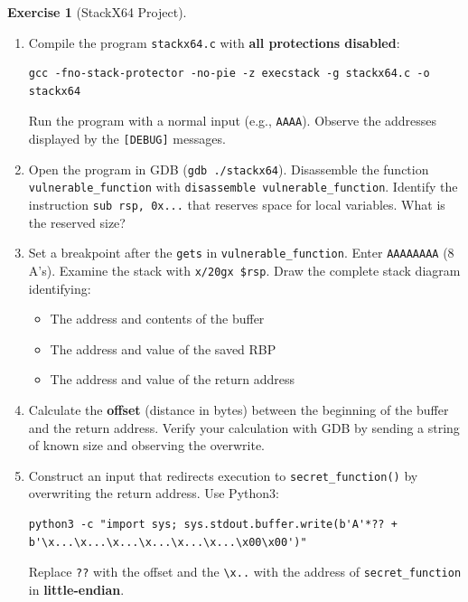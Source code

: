 \documentclass[a4paper,11pt]{article}
\theoremstyle{plain}
\theoremstyle{definition}
\newtheorem{exercice}{Exercise}
\begin{document}
\begin{exercice}[StackX64 Project]
\begin{enumerate}
\item[\textbf{1a)}] Compile the program \texttt{stackx64.c} with \textbf{all protections disabled}:
\begin{lstlisting}[style=GDBStyle]
gcc -fno-stack-protector -no-pie -z execstack -g stackx64.c -o stackx64
\end{lstlisting}
Run the program with a normal input (e.g., \texttt{AAAA}). Observe the addresses displayed by the \texttt{[DEBUG]} messages.

\item[\textbf{1b)}] Open the program in GDB (\texttt{gdb ./stackx64}). Disassemble the function \texttt{vulnerable\_function} with \texttt{disassemble vulnerable\_function}. Identify the instruction \texttt{sub rsp, 0x...} that reserves space for local variables. What is the reserved size?

\item[\textbf{1c)}] Set a breakpoint after the \texttt{gets} in \texttt{vulnerable\_function}. Enter \texttt{AAAAAAAA} (8 A's). Examine the stack with \texttt{x/20gx \$rsp}. Draw the complete stack diagram identifying:
\begin{itemize}
    \item The address and contents of the buffer
    \item The address and value of the saved RBP
    \item The address and value of the return address
\end{itemize}

\item[\textbf{1d)}] Calculate the \textbf{offset} (distance in bytes) between the beginning of the buffer and the return address. Verify your calculation with GDB by sending a string of known size and observing the overwrite.

\item[\textbf{1e)}] Construct an input that redirects execution to \texttt{secret\_function()} by overwriting the return address. Use Python3:
\begin{lstlisting}[style=GDBStyle]
python3 -c "import sys; sys.stdout.buffer.write(b'A'*?? + b'\x...\x...\x...\x...\x...\x...\x00\x00')"
\end{lstlisting}
Replace \texttt{??} with the offset and the \texttt{\textbackslash x..} with the address of \texttt{secret\_function} in \textbf{little-endian}.
\end{enumerate}

\begin{correction}


\end{correction}
\end{exercice}
\end{document}
